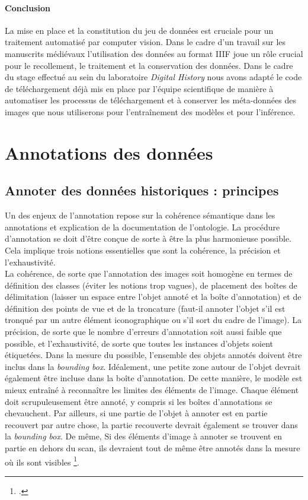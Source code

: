 \documentclass[12pt,twoside]{book}
\begin{document}
\paragraph{Conclusion}La mise en place et la constitution du jeu de données est cruciale pour un traitement automatisé par computer vision. Dans le cadre d’un travail sur les manuscrits médiévaux l’utilisation des données au format IIIF joue un rôle crucial pour le recollement, le traitement et la conservation des données. Dans le cadre du stage effectué au sein du laboratoire \textit{Digital History} nous avons adapté le code de téléchargement déjà mis en place par l’équipe scientifique de manière à automatiser les processus de téléchargement et à conserver les méta-données des images que nous utiliserons pour l’entraînement des modèles et pour l’inférence. 

\section{Annotations des données}
\subsection{Annoter des données historiques : principes}

Un des enjeux de l’annotation repose sur la cohérence sémantique dans les annotations et explication de la documentation de l'ontologie. La procédure d'annotation se doit d’être conçue de sorte à être la plus harmonieuse possible. Cela implique trois notions essentielles que sont la cohérence, la précision et l’exhaustivité. \\

La cohérence, de sorte que l'annotation des images soit homogène en termes de définition des classes (éviter les notions trop vagues), de placement des boîtes de délimitation (laisser un espace entre l’objet annoté et la boîte d’annotation) et de définition des points de vue et de la troncature (faut-il annoter l’objet s’il est tronqué par un autre élément iconographique ou s’il sort du cadre de l’image). La précision, de sorte que le nombre d'erreurs d'annotation soit aussi faible que possible, et l’exhaustivité, de sorte que toutes les instances d'objets soient étiquetées. Dans la mesure du possible, l'ensemble des objets annotés doivent être inclus dans la \textit{bounding box}. Idéalement, une petite zone autour de l’objet devrait également être incluse dans la boîte d'annotation. De cette manière, le modèle est mieux entraîné à reconnaître les limites des éléments de l'image. Chaque élément doit scrupuleusement être annoté, y compris si les boîtes d’annotations se chevauchent. Par ailleurs, si une partie de l’objet à annoter est en partie recouvert par autre chose, la partie recouverte devrait également se trouver dans la \textit{bounding box}. De même, Si des éléments d'image à annoter se trouvent en partie en dehors du scan, ils devraient tout de même être annotés dans la mesure où ils sont visibles \footcite{everingham_pascal_2010}.\\
\end{document}
